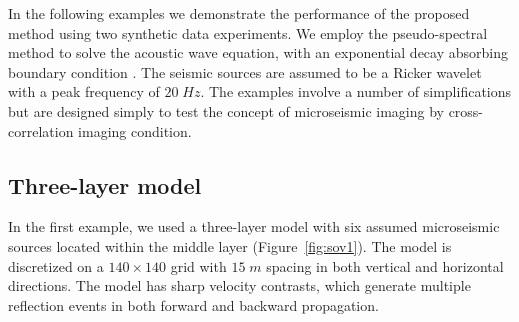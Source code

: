 In the following examples we demonstrate the performance of the proposed method using two synthetic data experiments. We employ the pseudo-spectral method \cite[]{reshef} to solve the acoustic wave equation, with an exponential decay absorbing boundary condition \cite[]{cerjan}. The seismic sources are assumed to be a Ricker wavelet with a peak frequency of $20\;Hz$. The examples involve a number of simplifications but are designed simply to test the concept of microseismic imaging by cross-correlation imaging condition.



\subsection{Three-layer model}

In the first example, we used a three-layer model with six assumed microseismic sources located within the middle layer (Figure~\ref{fig:sov1}). The model is discretized on a $140 \times 140$ grid with $15\;m$ spacing in both vertical and horizontal directions. The model has sharp velocity contrasts, which generate multiple reflection events in both forward and backward propagation.


